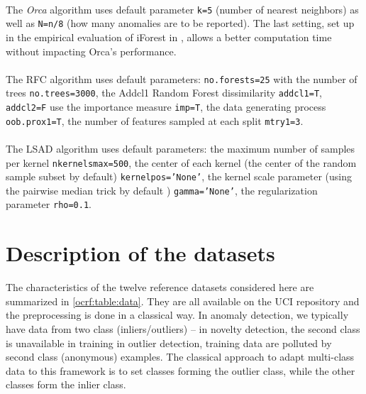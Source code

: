 \paragraph{}
The \emph{Orca} algorithm uses default parameter \texttt{k=5} (number of
nearest neighbors) as well as \texttt{N=n/8} (how many anomalies are to be
reported).  The last setting, set up in the empirical evaluation of iForest in
\citet{Liu2012}, allows a better computation time without impacting Orca's
performance.
\paragraph{}
The \ac{RFC} algorithm uses default parameters: \texttt{no.forests=25} with the
number of trees \texttt{no.trees=3000}, the Addcl1 Random Forest dissimilarity
\texttt{addcl1=T}, \texttt{addcl2=F} use the importance measure \texttt{imp=T},
the data generating process \texttt{oob.prox1=T}, the number of features
sampled at each split \texttt{mtry1=3}.
\paragraph{}
The \ac{LSAD} algorithm uses default parameters: the maximum number of samples
per kernel \texttt{n\textunderscore kernels\textunderscore max=500}, the center
of each kernel (the center of the random sample subset by default)
\texttt{kernel\textunderscore pos='None'}, the kernel scale parameter (using
the pairwise median trick by default \citep{jaakkola1999using})
\texttt{gamma='None'}, the regularization parameter \texttt{rho=0.1}.

\section{Description of the datasets}
\label{supp:dataset_description}
%
The characteristics of the twelve reference datasets considered here are
summarized in \cref{ocrf:table:data}. They are all available on the \acs{UCI}
repository \citep{Lichman2013} and the preprocessing is done in a classical
way. 
In anomaly detection, we typically have data from two class (inliers/outliers)
-- in novelty detection, the second class is unavailable in training in outlier
detection, training data are polluted by second class (anonymous) examples. The
classical approach to adapt multi-class data to this framework is to set
classes forming the outlier class, while the other classes form the inlier
class.
